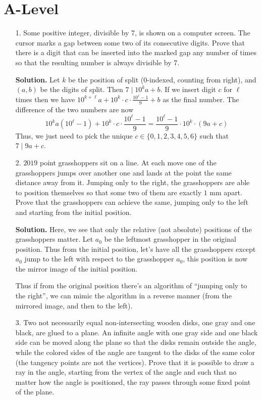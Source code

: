 \documentclass[11pt,a4paper]{article}
\begin{document}
\section*{A-Level}
\begin{enumerate}
	\item[1.]
	 Some positive integer, divisible by 7, is shown on a computer screen. The cursor marks
	a gap between some two of its consecutive digits. Prove that there is a digit that can
	be inserted into the marked gap any number of times so that the resulting number is
	always divisible by 7.
	
	\textbf{Solution.} 
	Let $k$ be the position of split (0-indexed, counting from right), 
	and $(a, b)$ be the digits of split. 
	Then $7\mid 10^ka+b$. 
	If we insert digit $c$ for $\ell$ times then we have $10^{k+\ell}a+10^k\cdot c\cdot \frac{10^{\ell}-1}{9}+b$ as the final number. 
	The difference of the two numbers are now 
	\[
	10^ka(10^{\ell}-1)+10^k\cdot c\cdot \frac{10^{\ell}-1}{9}
	=\frac{10^{\ell}-1}{9}\cdot 10^k\cdot (9a+c)
	\]
	Thus, we just need to pick the unique $c\in \{0, 1, 2, 3, 4, 5, 6\}$ such that $7\mid 9a+c$. 
	
	\item[2.]
	$2019$ point grasshoppers sit on a line. 
	At each move one of the grasshoppers jumps over another one and lands at the point the same distance away from it. 
	Jumping only to the right, the grasshoppers are able to position themselves so that some two of them are exactly $1$ mm apart. 
	Prove that the grasshoppers can achieve the same, jumping only to the left and starting from the initial position.
	
	\textbf{Solution.} 
	Here, we see that only the relative (not absolute) positions of the grasshoppers matter. 
	Let $a_0$ be the leftmost grasshopper in the original position. 
	Thus from the initial position, let's have all the grasshoppers except $a_0$ jump to the left with respect to the grasshopper $a_0$, 
	this position is now the mirror image of the initial position. 
	
	Thus if from the original position there's an algorithm of ``jumping only to the right'', 
	we can mimic the algorithm in a reverse manner (from the mirrored image, and then to the left). 
	
	\item[3.]
	Two not necessarily equal non-intersecting wooden disks, one gray and one black, are glued to a plane. 
	An infinite angle with one gray side and one black side can be moved along the plane so that the disks remain outside the angle, 
	while the colored sides of the angle are tangent to the disks of the same color (the tangency points are not the vertices). 
	Prove that it is possible to draw a ray in the angle, 
	starting from the vertex of the angle and such that no matter how the angle is positioned, 
	the ray passes through some fixed point of the plane.
	

\end{enumerate}
\end{document}
